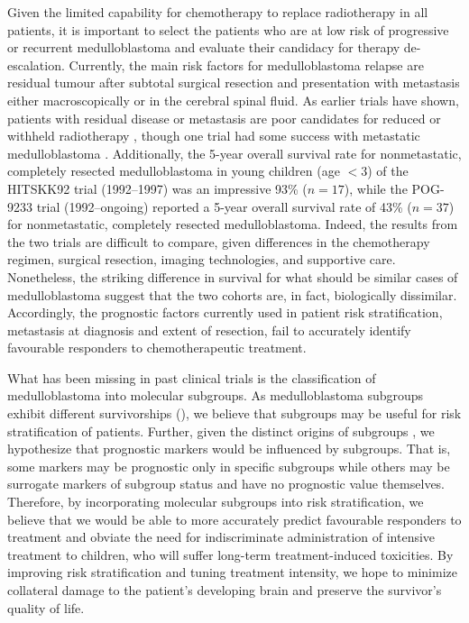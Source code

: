 Given the limited capability for chemotherapy to replace radiotherapy in all patients, it is important to select the patients who are at low risk of progressive or recurrent medulloblastoma and evaluate their candidacy for therapy de-escalation. Currently, the main risk factors for medulloblastoma relapse are residual tumour after subtotal surgical resection and presentation with metastasis either macroscopically or in the cerebral spinal fluid. As earlier trials have shown, patients with residual disease or metastasis are poor candidates for reduced or withheld radiotherapy , though one trial had some success with metastatic medulloblastoma . Additionally, the 5-year overall survival rate for nonmetastatic, completely resected medulloblastoma in young children (age $< 3$) of the HITSKK92 trial (1992--1997) was an impressive 93\% ($n = 17$), while the POG-9233 trial (1992--ongoing) reported a 5-year overall survival rate of 43\% ($n = 37$) for nonmetastatic, completely resected medulloblastoma. Indeed, the results from the two trials are difficult to compare, given differences in the chemotherapy regimen, surgical resection, imaging technologies, and supportive care. Nonetheless, the striking difference in survival for what should be similar cases of medulloblastoma suggest that the two cohorts are, in fact, biologically dissimilar. Accordingly, the prognostic factors currently used in patient risk stratification, metastasis at diagnosis and extent of resection, fail to accurately identify favourable responders to chemotherapeutic treatment.

What has been missing in past clinical trials is the classification of medulloblastoma into molecular subgroups. As medulloblastoma subgroups exhibit different survivorships (), we believe that subgroups may be useful for risk stratification of patients. Further, given the distinct origins of subgroups , we hypothesize that prognostic markers would be influenced by subgroups. That is, some markers may be prognostic only in specific subgroups while others may be surrogate markers of subgroup status and have no prognostic value themselves. Therefore, by incorporating molecular subgroups into risk stratification, we believe that we would be able to more accurately predict favourable responders to treatment and obviate the need for indiscriminate administration of intensive treatment to children, who will suffer long-term treatment-induced toxicities. By improving risk stratification and tuning treatment intensity, we hope to minimize collateral damage to the patient's developing brain and preserve the survivor's quality of life.

